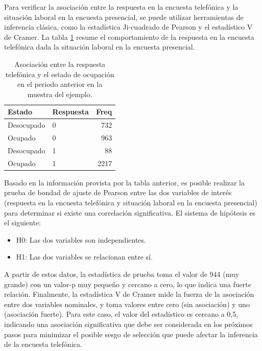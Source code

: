 \documentclass[
  12pt,
]{book}
\providecommand{\tightlist}{%
  \setlength{\itemsep}{0pt}\setlength{\parskip}{0pt}}
\begin{document}
Para verificar la asociación entre la respuesta en la encuesta telefónica y la situación laboral en la encuesta presencial, se puede utilizar herramientas de inferencia clásica, como la estadística Ji-cuadrado de Pearson y el estadístico V de Cramer. La tabla \ref{tab:tabsesgo9} resume el comportamiento de la respuesta en la encuesta telefónica dada la situación laboral en la encuesta presencial.

\begin{table}

\caption{\label{tab:tabsesgo9}Asociación entre la respuesta telefónica y el estado de ocupación en el periodo anterior en la muestra del ejemplo.}
\centering
\begin{tabular}[t]{l|l|r}
\hline
Estado & Respuesta & Freq\\
\hline
Desocupado & 0 & 732\\
\hline
Ocupado & 0 & 963\\
\hline
Desocupado & 1 & 88\\
\hline
Ocupado & 1 & 2217\\
\hline
\end{tabular}
\end{table}

Basado en la información provista por la tabla anterior, es posible realizar la prueba de bondad de ajuste de Pearson entre las dos variables de interés (respuesta en la encuesta telefónica y situación laboral en la encuesta presencial) para determinar si existe una correlación significativa. El sistema de hipótesis es el siguiente:

\begin{itemize}
\tightlist
\item
  H0: Las dos variables son independientes.
\item
  H1: Las dos variables se relacionan entre sí.
\end{itemize}

A partir de estos datos, la estadística de prueba toma el valor de 944 (muy grande) con un valor-p muy pequeño y cercano a cero, lo que indica una fuerte relación. Finalmente, la estadística V de Cramer mide la fuerza de la asociación entre dos variables nominales, y toma valores entre cero (sin asociación) y uno (asociación fuerte). Para este caso, el valor del estadístico es cercano a 0,5, indicando una asociación significativa que debe ser considerada en los próximos pasos para minimizar el posible sesgo de selección que puede afectar la inferencia de la encuesta telefónica.
\end{document}
